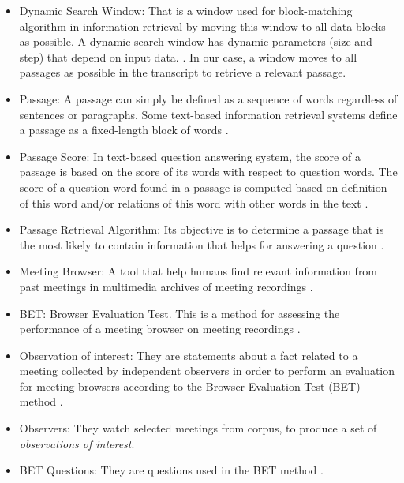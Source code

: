 \begin{itemize}
\item {Dynamic Search Window: That is a window used for block-matching algorithm in information retrieval by moving this window to all data blocks as possible. A dynamic search window has dynamic parameters (size and step) that depend on input data. \cite{goharian2008dsp}. In our case, a window moves to all passages as possible in the transcript to retrieve a relevant passage.}

\item {Passage: A passage can simply be defined as a sequence of words regardless of sentences or paragraphs. Some text-based information retrieval systems define a passage as a fixed-length block of words \cite{goharian2008dsp}.}

\item {Passage Score: In text-based question answering system, the score of a passage is based on the score of its words with respect to question words. The score of a question word found in a passage is computed based on definition of this word and/or relations of this word with other words in the text \cite{tellex2003qep}.}

\item {Passage Retrieval Algorithm: Its objective is to determine a passage that is the most likely to contain information that helps for answering a question \cite{tellex2003qep}.}

\item {Meeting Browser:  A tool that help humans find relevant information from past meetings in multimedia archives of meeting recordings \cite{popescubelis:tbe}.}

\item {BET: Browser Evaluation Test. This is a method for assessing the performance of a meeting browser on meeting recordings \cite{BET}.}

\item {Observation of interest: They are statements about a fact related to a meeting collected by independent observers in order to perform an evaluation for meeting browsers according to the Browser Evaluation Test (BET) method \cite{BET}.}

\item {Observers: They watch selected meetings from corpus, to produce a set of \textit{observations of interest}}.

\item {BET Questions: They are questions used in  the BET method \cite{popescubelis:tbe}.}


\end{itemize}
